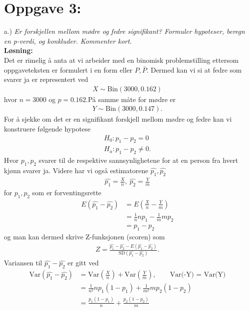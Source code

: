 \documentclass[12pt,
               a4paper,
               article,
               oneside,
               oldfontcommands,
               norsk]{memoir}
\begin{document}
\section*{Oppgave 3:}
a.) \emph{ Er forskjellen mellom mødre og fedre signifikant? Formuler hypoteser, beregn en p-verdi, og konkluder. Kommenter kort.}\vspace{4mm}\\ 
\textbf{Løsning:}\vspace{4mm}\\ 
Det er rimelig å anta at vi arbeider med en binomisk problemstilling ettersom oppgaveteksten er formulert i en  form eller $P, \bar{P}$. Dermed kan vi si at fedre som svarer ja er representert ved 
\begin{align*}
  X \sim \text{Bin}(3000, 0.162)
\end{align*}
hvor $n = 3000$ og $p = 0.162$.På samme måte for mødre er 
\begin{align*}
  Y \sim \text{Bin}(3000, 0.147).
\end{align*}
For å sjekke om det er en signifikant forskjell mellom mødre og fedre kan vi konstruere følgende hypotese 
\begin{align*}
  H_{0}: p_{1} - p_{2} = 0 \\[5pt] 
  H_{a}: p_{1} - p_{2} \neq 0.
\end{align*}
Hvor $p_{1}, p_{2}$ svarer til de respektive sannsynlighetene for at en person fra hvert kjønn svarer ja. Videre har vi også estimatorene $\hat{p_{1}}, \hat{p_{2}}$
\begin{align*}
\hat{p_{1}} = \frac{X}{n}, \ \hat{p_{2}} = \frac{Y}{m}
\end{align*}
for $p_{1},p_{2}$ som er forventingsrette 
\begin{align*}
  E\left(\hat{p_{1}} - \hat{p_{2}} \right) &= E\left( \frac{X}{n} - \frac{Y}{m} \right) \\[7pt]
  &= \frac{1}{n}np_{1} - \frac{1}{m}mp_{2} \\[7pt]
  &= p_{1} - p_{2}
\end{align*}
og man kan dermed skrive Z-funksjonen (scoren) som 
\begin{align*}
  Z = \frac{\hat{p_{1}} - \hat{p_{2}} - E \left( \hat{p_{1}} - \hat{p_{2}}\right)}{\text{SD}(\hat{p_{1}} - \hat{p_{2}})}.
\end{align*}
Variansen til $\hat{p_{1}} - \hat{p_{2}}$ er gitt ved
\begin{align*}
  \text{Var}(\hat{p_{1}} - \hat{p_{2}}) &= \text{Var}\left(\frac{X}{n} \right) + \text{Var}\left(\frac{Y}{m} \right), \qquad \boxed{\text{Var(-Y) = Var(Y)}} \\[7pt] 
  &= \frac{1}{n^2}np_{1}(1 - p_{1}) + \frac{1}{m^2}mp_{2}(1 - p_{2}) \\[7pt]
  &= \frac{p_{1}(1 - p_{1})}{n} + \frac{p_{2}(1 - p_{2})}{m}
\end{align*}
\end{document}
